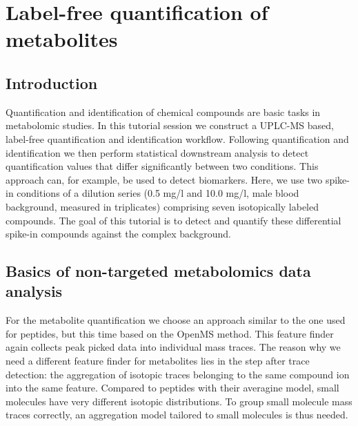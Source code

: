 
\newpage
\section{Label-free quantification of metabolites}

\subsection{Introduction}
Quantification and identification of chemical compounds are basic tasks in metabolomic studies. In this tutorial session we construct a UPLC-MS based, label-free quantification and identification workflow. Following quantification and identification we then perform statistical downstream analysis to detect quantification values that differ significantly between two conditions. This approach can, for example, be used to detect biomarkers. Here, we use two spike-in conditions of a dilution series (0.5 mg/l and 10.0 mg/l, male blood background, measured in triplicates) comprising seven isotopically labeled compounds. The goal of this tutorial is to detect and quantify these differential spike-in compounds against the complex background.


\subsection{Basics of non-targeted metabolomics data analysis}

For the metabolite quantification we choose an approach similar to the one used for peptides, but this time based on the OpenMS  method. This feature finder again collects peak picked data into individual mass traces. The reason why we need a different feature finder for metabolites lies in the step after trace detection: the aggregation of isotopic traces belonging to the same compound ion into the same feature. Compared to peptides with their averagine model, small molecules have very different isotopic distributions. To group small molecule mass traces correctly, an aggregation model tailored to small molecules is thus needed. 

